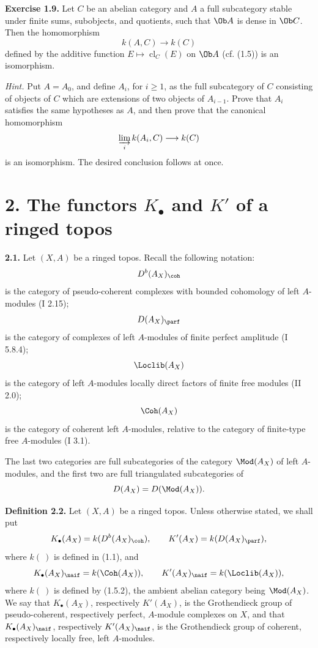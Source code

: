 \documentclass[11pt]{article}
\newcommand{\cl}{\operatorname{cl}}
\begin{document}
\textbf{Exercise 1.9.} Let \(C\) be an abelian category and \(A\) a full subcategory stable under finite sums, subobjects, and quotients, such that \(\Ob A\) is dense in \(\Ob C\). Then the homomorphism
\[
 k(A,C)\longrightarrow k(C)
\]
defined by the additive function \(E\mapsto\cl_C(E)\) on \(\Ob A\) (cf. (1.5)) is an isomorphism.

\emph{Hint.} Put \(A=A_0\), and define \(A_i\), for \(i\geq1\), as the full subcategory of \(C\) consisting of objects of \(C\) which are extensions of two objects of \(A_{i-1}\). Prove that \(A_i\) satisfies the same hypotheses as \(A\), and then prove that the canonical homomorphism
\[
 \varinjlim_i k(A_i,C)\longrightarrow k(C)
\]
is an isomorphism. The desired conclusion follows at once.

\section*{2. The functors \(K_{\bullet}\) and \(K'\) of a ringed topos}

\textbf{2.1.} Let \((X,A)\) be a ringed topos. Recall the following notation:
\[
 D^b(A_X)_{\coh}
\]
is the category of pseudo-coherent complexes with bounded cohomology of left \(A\)-modules (I 2.15);
\[
 D(A_X)_{\parf}
\]
is the category of complexes of left \(A\)-modules of finite perfect amplitude (I 5.8.4);
\[
 \Loclib(A_X)
\]
is the category of left \(A\)-modules locally direct factors of finite free modules (II 2.0);
\[
 \Coh(A_X)
\]
is the category of coherent left \(A\)-modules, relative to the category of finite-type free \(A\)-modules (I 3.1).

The last two categories are full subcategories of the category \(\Mod(A_X)\) of left \(A\)-modules, and the first two are full triangulated subcategories of
\[
 D(A_X)=D(\Mod(A_X)).
\]

\textbf{Definition 2.2.} Let \((X,A)\) be a ringed topos. Unless otherwise stated, we shall put
\[
 K_{\bullet}(A_X)=k(D^b(A_X)_{\coh}),\qquad
 K'(A_X)=k(D(A_X)_{\parf}),
\]
where \(k(\ )\) is defined in (1.1), and
\[
 K_{\bullet}(A_X)_{\naif}=k(\Coh(A_X)),\qquad
 K'(A_X)_{\naif}=k(\Loclib(A_X)),
\]
where \(k(\ )\) is defined by (1.5.2), the ambient abelian category being \(\Mod(A_X)\). We say that \(K_{\bullet}(A_X)\), respectively \(K'(A_X)\), is the Grothendieck group of pseudo-coherent, respectively perfect, \(A\)-module complexes on \(X\), and that \(K_{\bullet}(A_X)_{\naif}\), respectively \(K'(A_X)_{\naif}\), is the Grothendieck group of coherent, respectively locally free, left \(A\)-modules.
\end{document}
